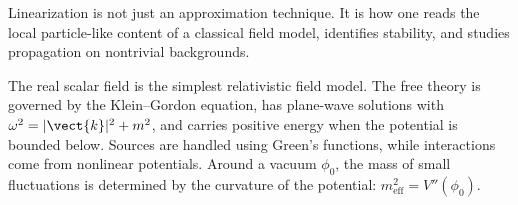 Linearization is not just an approximation technique. It is how one reads the
local particle-like content of a classical field model, identifies stability,
and studies propagation on nontrivial backgrounds.

\begin{summarybox}
The real scalar field is the simplest relativistic field model. The free theory
is governed by the Klein--Gordon equation, has plane-wave solutions with
\(\omega^2=|\vect{k}|^2+m^2\), and carries positive energy when the potential is
bounded below. Sources are handled using Green's functions, while interactions
come from nonlinear potentials. Around a vacuum \(\phi_0\), the mass of small
fluctuations is determined by the curvature of the potential:
\(m_{\mathrm{eff}}^2=V''(\phi_0)\).
\end{summarybox}
